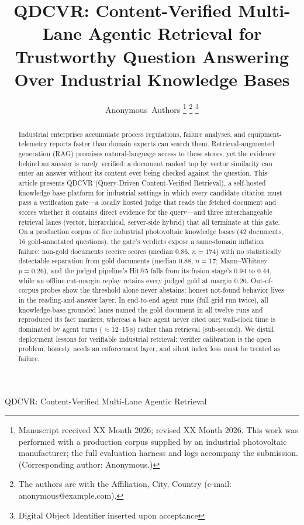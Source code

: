 \documentclass[journal]{IEEEtran}
\begin{document}
\title{QDCVR: Content-Verified Multi-Lane Agentic Retrieval for
Trustworthy Question Answering Over Industrial Knowledge Bases}

\author{Anonymous~Authors%
\thanks{Manuscript received XX Month 2026; revised XX Month 2026. This work
was performed with a production corpus supplied by an industrial
photovoltaic manufacturer; the full evaluation harness and logs accompany
the submission. (Corresponding author: Anonymous.)}%
\thanks{The authors are with the Affiliation, City, Country
(e-mail: anonymous@example.com).}%
\thanks{Digital Object Identifier inserted upon acceptance}}

%
{QDCVR: Content-Verified Multi-Lane Agentic Retrieval}

\maketitle

\begin{abstract}
Industrial enterprises accumulate process regulations, failure analyses,
and equipment-telemetry reports faster than domain experts can search
them. Retrieval-augmented generation (RAG) promises natural-language
access to these stores, yet the evidence behind an answer is rarely
verified: a document ranked top by vector similarity can enter an answer
without its content ever being checked against the question. This article
presents QDCVR (Query-Driven Content-Verified Retrieval), a self-hosted
knowledge-base platform for industrial settings in which every candidate
citation must pass a verification gate---a locally hosted judge that reads
the fetched document and scores whether it contains direct evidence for
the query---and three interchangeable retrieval lanes (vector,
hierarchical, server-side hybrid) that all terminate at this gate. On a
production corpus of five industrial photovoltaic knowledge bases
(42 documents, 16 gold-annotated questions), the gate's verdicts expose a
same-domain inflation failure: non-gold documents receive scores (median
0.86, $n{=}174$) with no statistically detectable separation from gold
documents (median 0.88, $n{=}17$; Mann--Whitney $p{=}0.26$), and the
judged pipeline's Hit@5 falls from its fusion stage's 0.94 to 0.44, while
an offline cut-margin replay retains every judged gold at margin 0.20.
Out-of-corpus probes show the threshold alone never abstains; honest
not-found behavior lives in the reading-and-answer layer. In end-to-end
agent runs (full grid run twice), all knowledge-base-grounded lanes named
the gold document in all twelve runs and reproduced its fact markers,
whereas a bare agent never cited one; wall-clock time is dominated by
agent turns ($\approx$12--15\,s) rather than retrieval (sub-second). We
distill deployment lessons for verifiable industrial retrieval: verifier
calibration is the open problem, honesty needs an enforcement layer, and
silent index loss must be treated as failure.
\end{abstract}
\end{document}
